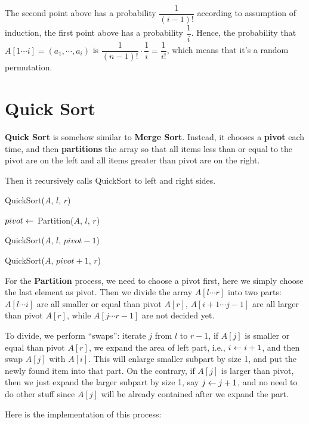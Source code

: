 \begin{spacing}{1.3}
    The second point above has a probability $\dfrac{1}{(i-1)!}$ according 
    to assumption of induction, the first point above has a probability 
    $\dfrac{1}{i}$. Hence, the probability that $A[1\cdots i]=(a_1,\cdots,a_i)$
    is $\dfrac{1}{(n-1)!}\cdot \dfrac{1}{i}=\dfrac{1}{i!}$, which 
    means that it's a random permutation.

    \section{Quick Sort}

    {\bf Quick Sort} is somehow similar to {\bf Merge Sort}. Instead, 
    it chooses a {\bf pivot} each time, and then {\bf partitions}
    the array so that all items less than or equal to the pivot are 
    on the left and all items greater than pivot are 
    on the right.

    Then it recursively calls QuickSort to left and right sides.

    \begin{algorithm*}
        \caption{QuickSort($A$, $l$, $r$)}

        $pivot\leftarrow $ Partition($A$, $l$, $r$)

        QuickSort($A$, $l$, $pivot - 1$)\qquad {}

        QuickSort($A$, $pivot+1$, $r$)\qquad {}
    \end{algorithm*}

    For the {\bf Partition} process, we need to choose a pivot first, 
    here we simply choose the last element as pivot. 
    Then we divide the array $A[l\cdots r]$ into two parts: 
    $A[l\cdots i]$ are all smaller or equal than pivot $A[r]$, $A[i+1\cdots j-1]$
    are all larger than pivot $A[r]$, while $A[j\cdots r-1]$ 
    are not decided yet.

    To divide, we perform ``swaps'': iterate $j$ from $l$ to $r-1$,
    if $A[j]$ is smaller or equal than pivot $A[r]$, we expand 
    the area of left part, i.e., $i\leftarrow i+1$, and then swap 
    $A[j]$ with $A[i]$. This will enlarge smaller subpart by size 1, 
    and put the newly found item into that part.
    On the contrary, if $A[j]$ is larger than pivot, then we 
    just expand the larger subpart by size 1, say $j\leftarrow j+1$,
    and no need to do other stuff since $A[j]$ will be already 
    contained after we expand the part.

    Here is the implementation of this process: 


\end{spacing}

